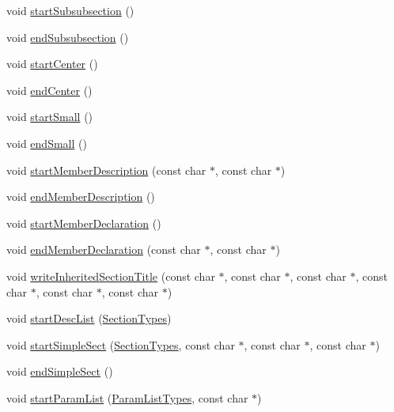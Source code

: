 \begin{DoxyCompactItemize}
\item 
void \hyperlink{class_r_t_f_generator_a1b2ed71d67f00e2f067648714393341b}{start\+Subsubsection} ()
\item 
void \hyperlink{class_r_t_f_generator_a15b343f2ae0d87433bfb28a92b02d502}{end\+Subsubsection} ()
\item 
void \hyperlink{class_r_t_f_generator_aeaaadb26bd52241ae6a838608f30652b}{start\+Center} ()
\item 
void \hyperlink{class_r_t_f_generator_ad5b630364443ea63a67af9166b9cbaad}{end\+Center} ()
\item 
void \hyperlink{class_r_t_f_generator_abef7c0c5864bfb1dfce99d181ae1e51c}{start\+Small} ()
\item 
void \hyperlink{class_r_t_f_generator_a2ac789ba16b4fa9f8c64fe59041e9699}{end\+Small} ()
\item 
void \hyperlink{class_r_t_f_generator_acddb6637fb551b498568a0e1fc89a54a}{start\+Member\+Description} (const char $\ast$, const char $\ast$)
\item 
void \hyperlink{class_r_t_f_generator_a0917bcbff0ed93c3f75da305b0f2f1be}{end\+Member\+Description} ()
\item 
void \hyperlink{class_r_t_f_generator_a733845745c3daac9a3700cedbbfc170a}{start\+Member\+Declaration} ()
\item 
void \hyperlink{class_r_t_f_generator_af6b3e0830a873ad488dd3f2773f7ec15}{end\+Member\+Declaration} (const char $\ast$, const char $\ast$)
\item 
void \hyperlink{class_r_t_f_generator_aaeb7e296fe3ca59058849fbee8340eb6}{write\+Inherited\+Section\+Title} (const char $\ast$, const char $\ast$, const char $\ast$, const char $\ast$, const char $\ast$, const char $\ast$)
\item 
void \hyperlink{class_r_t_f_generator_a338a41a2e7386886111024d33bc8ac77}{start\+Desc\+List} (\hyperlink{class_base_output_doc_interface_a07a3d5df76a714674e070e5e236fe886}{Section\+Types})
\item 
void \hyperlink{class_r_t_f_generator_a13765dff479a88399169576b49350909}{start\+Simple\+Sect} (\hyperlink{class_base_output_doc_interface_a07a3d5df76a714674e070e5e236fe886}{Section\+Types}, const char $\ast$, const char $\ast$, const char $\ast$)
\item 
void \hyperlink{class_r_t_f_generator_a8afb99af4261fe3e962951a6bc9ba4b8}{end\+Simple\+Sect} ()
\item 
void \hyperlink{class_r_t_f_generator_a009a5bf6c30b65c6aa66d9cd924f0af7}{start\+Param\+List} (\hyperlink{class_base_output_doc_interface_a944ed4d9fb389999c2724eeb321b8c8c}{Param\+List\+Types}, const char $\ast$)

\end{DoxyCompactItemize}
